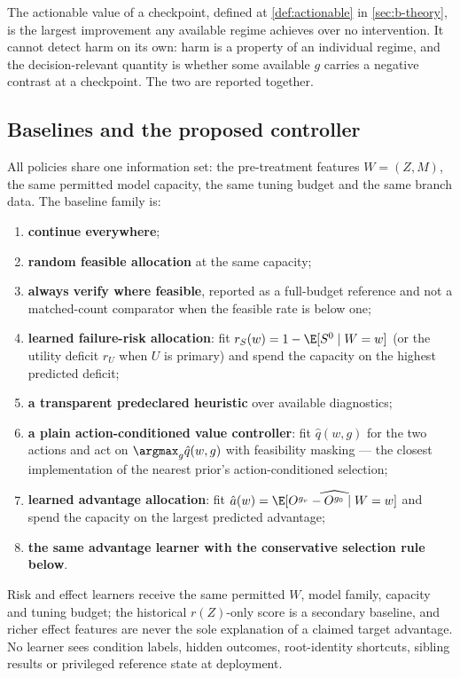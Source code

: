 The actionable value of a checkpoint, defined at \cref{def:actionable} in
\cref{sec:b-theory}, is the largest improvement any available regime achieves
over no intervention.  It cannot detect harm on its own: harm is a property of
an individual regime, and the decision-relevant quantity is whether some
available $g$ carries a negative contrast at a checkpoint.  The two are
reported together.

\subsection{Baselines and the proposed controller}
\label{sec:rl}

All policies share one information set: the pre-treatment features $W=(Z,M)$,
the same permitted model capacity, the same tuning budget and the same branch
data.  The baseline family is:
\begin{enumerate}[label=(\alph*),leftmargin=2em]
\item \textbf{continue everywhere};
\item \textbf{random feasible allocation} at the same capacity;
\item \textbf{always verify where feasible}, reported as a full-budget
  reference and not a matched-count comparator when the feasible rate is below
  one;
\item \textbf{learned failure-risk allocation}: fit $r_S(w)=1-\E[S^0\mid W=w]$
  (or the utility deficit $r_U$ when $U$ is primary) and spend the capacity on
  the highest predicted deficit;
\item \textbf{a transparent predeclared heuristic} over available diagnostics;
\item \textbf{a plain action-conditioned value controller}: fit
  $\hat q(w,g)$ for the two actions and act on
  $\argmax_g \hat q(w,g)$ with feasibility masking --- the closest
  implementation of the nearest prior's action-conditioned selection;
\item \textbf{learned advantage allocation}: fit
  $\hat a(w)=\widehat{\E[O^{g_v}-O^{g_0}\mid W=w]}$ and spend the capacity on
  the largest predicted advantage;
\item \textbf{the same advantage learner with the conservative selection rule
  below}.
\end{enumerate}
Risk and effect learners receive the same permitted $W$, model family, capacity
and tuning budget; the historical $r(Z)$-only score is a secondary baseline, and
richer effect features are never the sole explanation of a claimed target
advantage.  No learner sees condition labels, hidden outcomes, root-identity
shortcuts, sibling results or privileged reference state at deployment.

